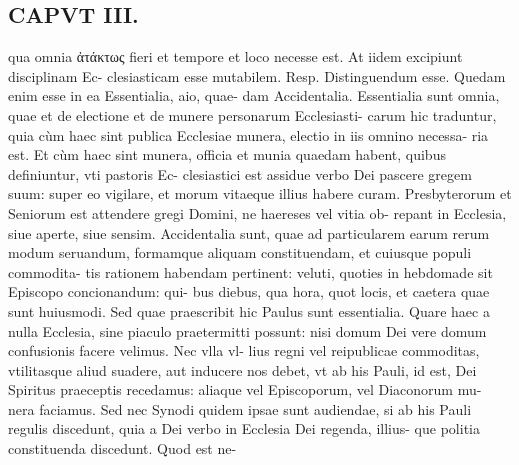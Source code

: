 \documentclass{article}
\begin{document}
\begin{pages}
\section*{CAPVT  III. }
\marginpar{[ p.169 ]}\pstart qua omnia ἀτάκτως fieri et tempore et loco necesse est. At iidem excipiunt disciplinam Ec- clesiasticam esse mutabilem. Resp. Distinguendum esse. Quedam enim esse in ea Essentialia, aio, quae- dam Accidentalia. Essentialia sunt omnia, quae et de electione et de munere personarum Ecclesiasti- carum hic traduntur, quia cùm haec sint publica Ecclesiae munera, electio in iis omnino necessa- ria est. Et cùm haec sint munera, officia et munia quaedam habent, quibus definiuntur, vti pastoris Ec- clesiastici est assidue verbo Dei pascere gregem suum: super eo vigilare, et morum vitaeque illius habere curam. Presbyterorum et Seniorum est attendere gregi Domini, ne haereses vel vitia ob- repant in Ecclesia, siue aperte, siue sensim.  \pend\pstart Accidentalia sunt, quae ad particularem earum rerum modum seruandum, formamque aliquam constituendam, et cuiusque populi commodita- tis rationem habendam pertinent: veluti, quoties in hebdomade sit Episcopo concionandum: qui- bus diebus, qua hora, quot locis, et caetera quae sunt huiusmodi. Sed quae praescribit hic Paulus sunt essentialia. Quare haec a nulla Ecclesia, sine piaculo praetermitti possunt: nisi domum Dei vere domum confusionis facere velimus. Nec vlla vl- lius regni vel reipublicae commoditas, vtilitasque aliud suadere, aut inducere nos debet, vt ab his Pauli, id est, Dei Spiritus praeceptis recedamus: aliaque vel Episcoporum, vel Diaconorum mu- nera faciamus. Sed nec Synodi quidem ipsae sunt audiendae, si ab his Pauli regulis discedunt, quia a Dei verbo in Ecclesia Dei regenda, illius- que politia constituenda discedunt. Quod est ne-  \pend

\end{pages}
\end{document}
